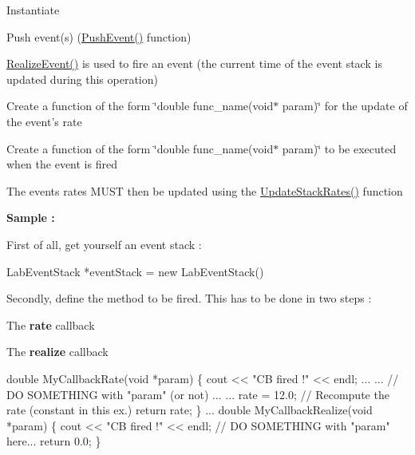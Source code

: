 \begin{DoxyItemize}
\item Instantiate
\item Push event(s) (\hyperlink{classelps_1_1_lab_event_stack_a0cf4b5b8bf78009aa20fc073f7ebfa6d}{Push\-Event()} function)
\item \hyperlink{classelps_1_1_lab_event_stack_a8335ecf33bf6210d5cb9c8d30a125f6e}{Realize\-Event()} is used to fire an event (the current time of the event stack is updated during this operation)
\begin{DoxyItemize}
\item Create a function of the form \char`\"{}double func\-\_\-name(void$\ast$ param)\char`\"{} for the update of the event's rate
\item Create a function of the form \char`\"{}double func\-\_\-name(void$\ast$ param)\char`\"{} to be executed when the event is fired
\end{DoxyItemize}
\item The events rates M\-U\-S\-T then be updated using the \hyperlink{classelps_1_1_lab_event_stack_a2c69343fc9e0218238c51004d854f900}{Update\-Stack\-Rates()} function
\end{DoxyItemize}

{\bfseries Sample \-:}\par
\par
 First of all, get yourself an event stack \-:


\begin{DoxyCode}
LabEventStack *eventStack = \textcolor{keyword}{new} LabEventStack()
\end{DoxyCode}


Secondly, define the method to be fired. This has to be done in two steps \-:
\begin{DoxyItemize}
\item The {\bfseries rate} callback
\item The {\bfseries realize} callback
\end{DoxyItemize}

\par



\begin{DoxyCode}
\textcolor{keywordtype}{double} MyCallbackRate(\textcolor{keywordtype}{void} *param)
\{
        cout << \textcolor{stringliteral}{"CB fired !"} << endl;
        ...
        ...                                         \textcolor{comment}{// DO SOMETHING with
       "param" (or not) ...}
        ...
        rate = 12.0;                                \textcolor{comment}{// Recompute the rate
       (constant in this ex.)}
        \textcolor{keywordflow}{return} rate;
\}
...
double MyCallbackRealize(\textcolor{keywordtype}{void} *param)
\{
        cout << \textcolor{stringliteral}{"CB fired !"} << endl;
        \textcolor{comment}{// DO SOMETHING with "param" here...}
        \textcolor{keywordflow}{return} 0.0;
\}
\end{DoxyCode}


